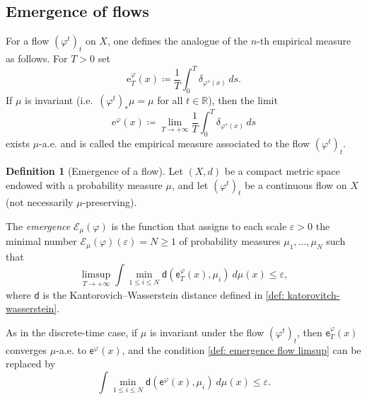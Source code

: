 \documentclass[11pt,reqno]{amsart}
\theoremstyle{plain}
\theoremstyle{definition}
\newtheorem{definition}[theorem]{Definition}
\theoremstyle{remark}
\theoremstyle{plain}
\numberwithin{equation}{section}
\begin{document}
\subsection{Emergence of flows} 

For a flow $(\varphi^{t})_{t}$ on $X$, one defines the analogue of the $n$-th empirical measure as follows. For $T>0$ set
\[
\mathrm{e}^{\varphi}_{T}(x)\coloneqq \frac{1}{T}\int_{0}^{T}\delta_{\varphi^{s}(x)}\,ds.
\]
If $\mu$ is invariant (i.e.\ $(\varphi^{t})_{\ast}\mu=\mu$ for all $t\in\mathbb R$), then the limit
\[
\mathrm{e}^{\varphi}(x)\coloneqq \lim_{T\to +\infty}\frac{1}{T}\int_{0}^{T}\delta_{\varphi^{s}(x)}\,ds
\]
exists $\mu$-a.e. and is called the empirical measure associated to the flow $(\varphi^{t})_{t}$.


\begin{definition}[Emergence of a flow]\label{def: metric emergence of a flow}
	Let $(X,d)$ be a compact metric space endowed with a probability measure $\mu$, and let $(\varphi^{t})_{t}$ be a continuous flow on $X$ (not necessarily $\mu$-preserving). 
	
	The \textit{emergence} $\mathcal{E}_{\mu}(\varphi)$ is the function that assigns to each scale $\varepsilon>0$ the minimal number $\mathcal{E}_{\mu}(\varphi)(\varepsilon)=N\ge 1$ of probability measures $\mu_{1},\dots,\mu_{N}$ such that
	\begin{equation}\label{def: emergence flow limsup}
		\limsup_{T\to +\infty}\int \min_{1\le i\le N}\mathsf{d}(\mathsf{e}_{T}^{\varphi}(x),\mu_{i})\ d\mu(x)\le \varepsilon,
	\end{equation}
	where $\mathsf{d}$ is the Kantorovich--Wasserstein distance defined in \eqref{def: katorovitch-wasserstein}.
	\end{definition}

As in the discrete-time case, if $\mu$ is invariant under the flow $(\varphi^{t})_{t}$, then $\mathsf{e}_{T}^{\varphi}(x)$ converges $\mu$-a.e. to $\mathsf{e}^{\varphi}(x)$, and the condition \eqref{def: emergence flow limsup} can be replaced by
\begin{equation}\label{def: emergence flow}
	\int \min_{1\le i\le N}\mathsf{d}(\mathsf{e}^{\varphi}(x),\mu_{i})\ d\mu(x)\le \varepsilon.
\end{equation}
\end{document}
